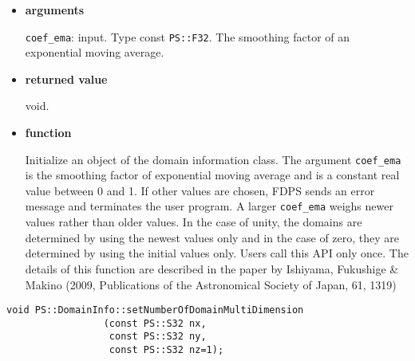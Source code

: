 \begin{itemize}

\item {\bf arguments}

\texttt{coef\_ema}: input. Type const {\tt PS::F32}. The smoothing factor of an
exponential moving average.

\item {\bf returned value}

void.

\item {\bf function}

Initialize an object of the domain information class. The argument
\texttt{coef\_ema} is the smoothing factor of exponential moving
average and is a constant real value between 0 and 1. If other values
are chosen, FDPS sends an error message and terminates the user
program.  A larger \texttt{coef\_ema} weighs newer values rather
than older values. In the case of unity, the domains are determined by
using the newest values only and in the case of zero, they are
determined by using the initial values only. Users call this API only
once. The details of this function are described in the paper by
Ishiyama, Fukushige \& Makino (2009, Publications of the Astronomical
Society of Japan, 61, 1319)


\end{itemize}


\begin{screen}
\begin{verbatim}
void PS::DomainInfo::setNumberOfDomainMultiDimension
                 (const PS::S32 nx,
                  const PS::S32 ny,
                  const PS::S32 nz=1);
\end{verbatim}
\end{screen}

